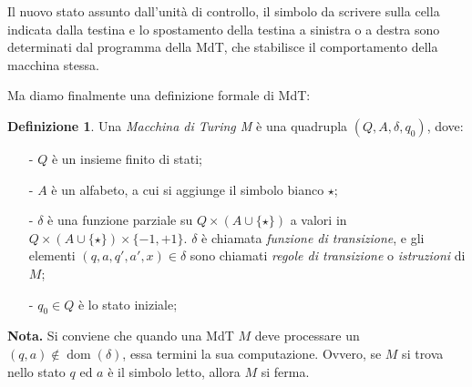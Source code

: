 \documentclass[12pt,a4paper]{report}
\theoremstyle{definition}
\newtheorem{defn}[teo]{Definizione}  %
\DeclareMathOperator{\dom}{dom}
\begin{document}
Il nuovo stato assunto dall'unità di controllo, il simbolo da scrivere sulla cella indicata dalla testina e lo spostamento della testina a sinistra o a destra sono determinati dal programma della MdT, che stabilisce il comportamento della macchina stessa.

Ma diamo finalmente una definizione formale di MdT:

\begin{defn}
Una \emph{Macchina di Turing M} è una quadrupla $(Q,A,\delta,q_0)$, dove:
\begin{itemize}
\item[-] $Q$ è un insieme finito di stati;
\item[-] $A$ è un alfabeto, a cui si aggiunge il simbolo bianco $\star$;
\item[-] $\delta$ è una funzione parziale su $Q \times (A \cup \{\star\})$ a valori in $Q \times (A \cup \{\star\}) \times \{-1,+1\}$. $\delta$ è chiamata \emph{funzione di transizione}, e gli elementi $(q,a,q',a',x) \in \delta$ sono chiamati \emph{regole di transizione} o \emph{istruzioni} di $M$;
\item[-] $q_0 \in Q$ è lo stato iniziale;
\end{itemize}
\end{defn}

\noindent \textbf{Nota.} Si conviene che quando una MdT $M$ deve processare un $(q,a) \not\in \dom(\delta)$, essa termini la sua computazione. Ovvero, se $M$ si trova nello stato $q$ ed $a$ è il simbolo letto, allora $M$ si ferma.
\end{document}
